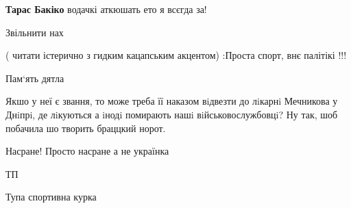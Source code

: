\begin{itemize}
\begin{itemize}
\textbf{Тарас Бакіко} водачкі аткюшать ето я всєгда за!
\end{itemize} %

 
Звільнити нах

 
( читати істерично з гидким кацапським акцентом) :Проста спорт, внє палітікі !!!

 

Пам‘ять дятла

 

Якшо у неї є звання, то може треба її наказом вiдвезти до лiкарнi Мечникова у
Днiпрi, де лiкуються а iнодi помирають нашi вiйськовослужбовцi? Ну так, шоб
побачила шо творить браццкий норот.


 
Насране! Просто насране а не українка

 
ТП

 
Тупа спортивна курка

\end{itemize} %

